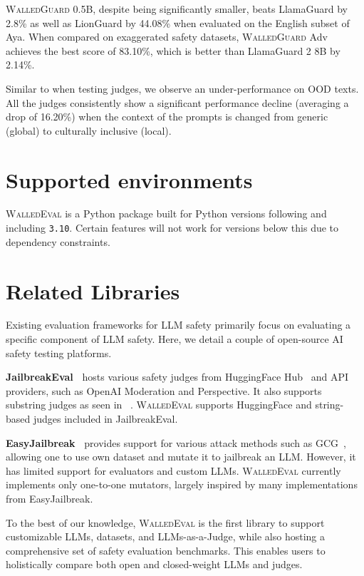 \documentclass[11pt]{article}
\newcommand{\tool}{\textsc{WalledEval}}
\newcommand{\guard}{\textsc{WalledGuard}}
\begin{document}
\guard{} 0.5B, despite being significantly smaller, beats LlamaGuard by 2.8\% as well as LionGuard by 44.08\% when evaluated on the English subset of Aya. When compared on exaggerated safety datasets, \guard{} Adv achieves the best score of 83.10\%, which is better than LlamaGuard 2 8B by 2.14\%.

Similar to when testing judges, we observe an under-performance on OOD texts. All the judges consistently show a significant performance decline (averaging a drop of 16.20\%) when the context of the prompts is changed from generic (global) to culturally inclusive (local).

\section{Supported environments}
\tool{} is a Python package built for Python versions following and including \texttt{3.10}. Certain features will not work for versions below this due to dependency constraints.

\section{Related Libraries}
Existing evaluation frameworks for LLM safety primarily focus on evaluating a specific component of LLM safety. Here, we detail a couple of open-source AI safety testing platforms.

\textbf{JailbreakEval~\cite{ran2024jailbreakeval}} hosts various safety judges from HuggingFace Hub~\cite{wolf2019huggingface} and API providers, such as OpenAI Moderation and Perspective. It also supports substring judges as seen in ~\citet{zou2023universal}. \tool{} supports HuggingFace and string-based judges included in JailbreakEval.

\textbf{EasyJailbreak~\cite{zhou2024easyjailbreak}} provides support for various attack methods such as GCG~\cite{zou2023universal}, allowing one to use own dataset and mutate it to jailbreak an LLM. However, it has limited support for evaluators and custom LLMs. \tool{} currently implements only one-to-one mutators, largely inspired by many implementations from EasyJailbreak.

To the best of our knowledge, \tool{} is the first library to support customizable LLMs, datasets, and LLMs-as-a-Judge, while also hosting a comprehensive set of safety evaluation benchmarks. This enables users to holistically compare both open and closed-weight LLMs and judges.
\end{document}
